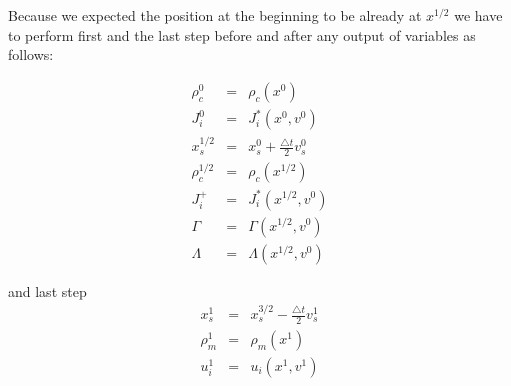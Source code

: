 \documentclass[oneside,branding,toc,article]{satdoc}
\begin{document}
Because we expected the position at the beginning to be already at $x^{1/2}$ we
have to perform first and the last step before and after any output of
variables as follows:

\begin{eqnarray}
  \label{eq:first}
  \rho_c^{0} & = & \rho_c (x^{0}) \nonumber \\
  J_i^0 & = & J_i^* (x^{0}, v^0) \nonumber \\
  x_s^{1/2} & = & x_s^{0} + \frac{\triangle t}{2} v_s^{0} \nonumber \\
  \rho_c^{1/2} & = & \rho_c (x^{1/2}) \nonumber \\
  J_i^+ & = & J_i^* (x^{1/2}, v^0) \nonumber \\
  \Gamma & = & \Gamma (x^{1/2}, v^0) \nonumber \\
  \Lambda & = & \Lambda (x^{1/2}, v^0) \nonumber
\end{eqnarray}

and last step
\begin{eqnarray}
  \label{eq:last}
  x_s^{1} & = & x_s^{3/2} - \frac{\triangle t}{2} v_s^{1} \nonumber \\
  \rho_m^{1} & = & \rho_m (x^{1}) \nonumber \\
  u_i^{1} & = & u_i (x^{1}, v^1) \nonumber
\end{eqnarray}
\end{document}
